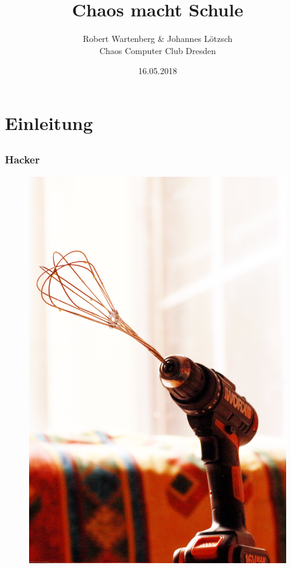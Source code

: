 \documentclass[12pt]{beamer}
\title{Chaos macht Schule}
\author{\small Robert Wartenberg \& Johannes Lötzsch\\\large Chaos Computer Club Dresden}
\date{16.05.2018}
\begin{document}
\maketitle

\section{Einleitung}
\subsection{}

\begin{frame}
  \frametitle{Hacker}
  \begin{figure}
    \includegraphics[height=0.7\textheight]{img/schneeschrauber.jpg}
  \end{figure}
\end{frame}
\end{document}
